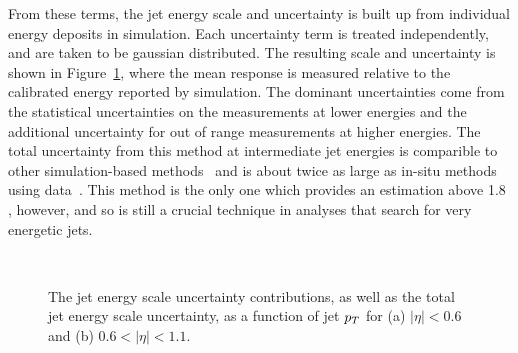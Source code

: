 From these terms, the jet energy scale and uncertainty is built up from individual energy deposits in simulation. 
Each uncertainty term is treated independently, and are taken to be gaussian distributed.
The resulting scale and uncertainty is shown in Figure~\ref{fig:jes_uncertainty}, where the mean response is measured relative to the calibrated energy reported by simulation.
The dominant uncertainties come from the statistical uncertainties on the \ep measurements at lower energies and the additional uncertainty for out of range measurements at higher energies. 
The total uncertainty from this method at intermediate jet energies is comparible to other simulation-based methods~\cite{PERF-2011-03} and is about twice as large as in-situ methods using data~\cite{PERF-2012-01}. 
This method is the only one which provides an estimation above 1.8 \TeV, however, and so is still a crucial technique in analyses that search for very energetic jets.

\begin{figure}[ht]
\centering
{} \\
\caption{ The jet energy scale uncertainty contributions, as well as the total jet energy scale uncertainty, as a function of jet $p_T$ for (a) $|\eta| < 0.6$ and (b) $0.6 < |\eta| < 1.1$.}
\label{fig:jes_uncertainty}
\end{figure}


